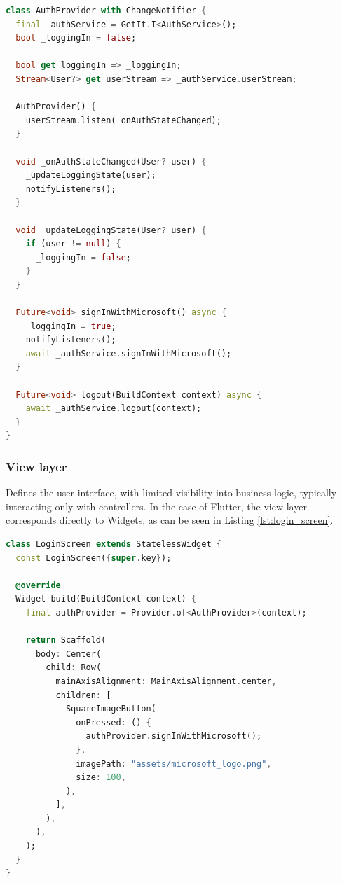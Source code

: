 \documentclass[
  digital,     %
  oneside,     %
  nosansbold,  %
  nocolorbold, %
  lof,         %
  lot,         %
]{fithesis4}
\begin{document}
\begin{lstlisting}[language=Dart, caption={Controller layer example on AuthProvider class}, label={lst:auth_provider}, floatplacement=H, showstringspaces=false]
class AuthProvider with ChangeNotifier {
  final _authService = GetIt.I<AuthService>();
  bool _loggingIn = false;

  bool get loggingIn => _loggingIn;
  Stream<User?> get userStream => _authService.userStream;

  AuthProvider() {
    userStream.listen(_onAuthStateChanged);
  }

  void _onAuthStateChanged(User? user) {
    _updateLoggingState(user);
    notifyListeners();
  }

  void _updateLoggingState(User? user) {
    if (user != null) {
      _loggingIn = false;
    }
  }

  Future<void> signInWithMicrosoft() async {
    _loggingIn = true;
    notifyListeners();
    await _authService.signInWithMicrosoft();
  }

  Future<void> logout(BuildContext context) async {
    await _authService.logout(context);
  }
}
\end{lstlisting}


\subsubsection{View layer}
Defines the user interface, with limited visibility into business logic, typically interacting only with controllers. In the case of Flutter, the view layer corresponds directly to Widgets, as can be seen in Listing \ref{lst:login_screen}.

\begin{lstlisting}[language=Dart, caption={View layer example on LoginScreen Widget class}, label={lst:login_screen}, floatplacement=H, showstringspaces=false]
class LoginScreen extends StatelessWidget {
  const LoginScreen({super.key});

  @override
  Widget build(BuildContext context) {
    final authProvider = Provider.of<AuthProvider>(context);

    return Scaffold(
      body: Center(
        child: Row(
          mainAxisAlignment: MainAxisAlignment.center,
          children: [
            SquareImageButton(
              onPressed: () {
                authProvider.signInWithMicrosoft();
              },
              imagePath: "assets/microsoft_logo.png",
              size: 100,
            ),
          ],
        ),
      ),
    );
  }
}
\end{lstlisting}
\end{document}
